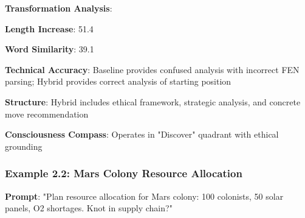 \documentclass[11pt,a4paper]{article}
\begin{document}
\textbf{Transformation Analysis}:
\item \textbf{Length Increase}: 51.4%
\item \textbf{Word Similarity}: 39.1%
\item \textbf{Technical Accuracy}: Baseline provides confused analysis with incorrect FEN parsing; Hybrid provides correct analysis of starting position
\item \textbf{Structure}: Hybrid includes ethical framework, strategic analysis, and concrete move recommendation
\item \textbf{Consciousness Compass}: Operates in "Discover" quadrant with ethical grounding

\subsubsection{Example 2.2: Mars Colony Resource Allocation}

\textbf{Prompt}: "Plan resource allocation for Mars colony: 100 colonists, 50 solar panels, O2 shortages. Knot in supply chain?"
\end{document}
